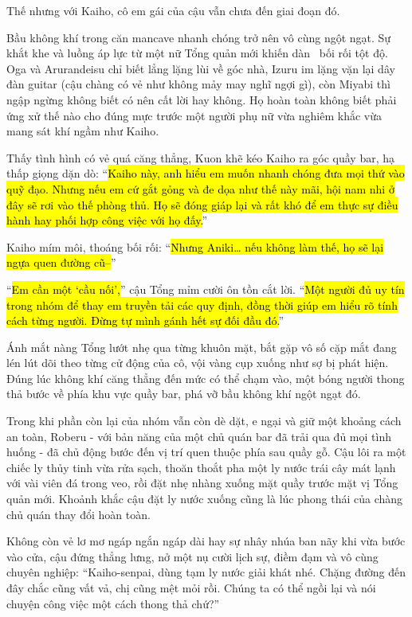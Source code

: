 \documentclass[../main.tex]{subfiles}
\begin{document}
Thế nhưng với Kaiho, cô em gái của cậu vẫn chưa đến giai đoạn đó.

Bầu không khí trong căn mancave nhanh chóng trở nên vô cùng ngột ngạt. Sự khắt khe và luồng áp lực từ một nữ Tổng quản mới khiến dàn \hls\ bối rối tột độ. Oga và Arurandeisu chỉ biết lẳng lặng lùi về góc nhà, Izuru im lặng vặn lại dây đàn guitar (cậu chàng có vẻ như không mảy may nghĩ ngợi gì), còn Miyabi thì ngập ngừng không biết có nên cất lời hay không. Họ hoàn toàn không biết phải ứng xử thế nào cho đúng mực trước một người phụ nữ vừa nghiêm khắc vừa mang sát khí ngầm như Kaiho.

Thấy tình hình có vẻ quá căng thẳng, Kuon khẽ kéo Kaiho ra góc quầy bar, hạ thấp giọng dặn dò: ``\hl{Kaiho này, anh hiểu em muốn nhanh chóng đưa mọi thứ vào quỹ đạo. Nhưng nếu em cứ gắt gỏng và đe dọa như thế này mãi, hội nam nhi ở đây sẽ rơi vào thế phòng thủ. Họ sẽ đóng giáp lại và rất khó để em thực sự điều hành hay phối hợp công việc với họ đấy.}''

Kaiho mím môi, thoáng bối rối: ``\hl{Nhưng Aniki\dots{} nếu không làm thế, họ sẽ lại ngựa quen đường cũ--}''

``\hl{Em cần một `cầu nối',}'' cậu Tổng mỉm cười ôn tồn cắt lời. ``\hl{Một người đủ uy tín trong nhóm để thay em truyền tải các quy định, đồng thời giúp em hiểu rõ tính cách từng người. Đừng tự mình gánh hết sự đối đầu đó.}''

Ánh mắt nàng Tổng lướt nhẹ qua từng khuôn mặt, bắt gặp vô số cặp mắt đang lén lút dõi theo từng cử động của cô, vội vàng cụp xuống như sợ bị phát hiện. Đúng lúc không khí căng thẳng đến mức có thể chạm vào, một bóng người thong thả bước về phía khu vực quầy bar, phá vỡ bầu không khí ngột ngạt đó.

Trong khi phần còn lại của nhóm vẫn còn dè dặt, e ngại và giữ một khoảng cách an toàn, Roberu - với bản năng của một chủ quán bar đã trải qua đủ mọi tình huống - đã chủ động bước đến vị trí quen thuộc phía sau quầy gỗ. Cậu lôi ra một chiếc ly thủy tinh vừa rửa sạch, thoăn thoắt pha một ly nước trái cây mát lạnh với vài viên đá trong veo, rồi đặt nhẹ nhàng xuống mặt quầy trước mặt vị Tổng quản mới. Khoảnh khắc cậu đặt ly nước xuống cũng là lúc phong thái của chàng chủ quán thay đổi hoàn toàn.

Không còn vẻ lơ mơ ngáp ngắn ngáp dài hay sự nhây nhúa ban nãy khi vừa bước vào cửa, cậu đứng thẳng lưng, nở một nụ cười lịch sự, điềm đạm và vô cùng chuyên nghiệp: ``Kaiho-senpai, dùng tạm ly nước giải khát nhé. Chặng đường đến đây chắc cũng vất vả, chị cũng mệt mỏi rồi. Chúng ta có thể ngồi lại và nói chuyện công việc một cách thong thả chứ?''
\end{document}
